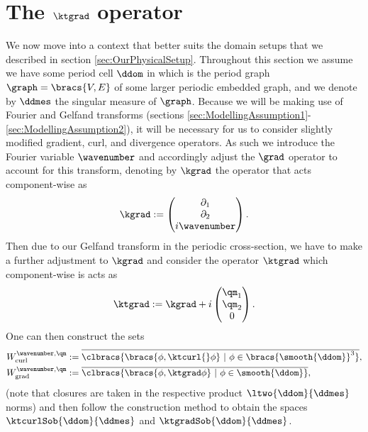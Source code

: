 \section{The $\ktgrad$ operator} \label{sec:ktOperator}
We now move into a context that better suits the domain setups that we described in section \ref{sec:OurPhysicalSetup}.
Throughout this section we assume we have some period cell $\ddom$ in which is the period graph $\graph=\bracs{V,E}$ of some larger periodic embedded graph, and we denote by $\ddmes$ the singular measure of $\graph$.
Because we will be making use of Fourier and Gelfand transforms (sections \ref{sec:ModellingAssumption1}-\ref{sec:ModellingAssumption2}), it will be necessary for us to consider slightly modified gradient, curl, and divergence operators.
As such we introduce the Fourier variable $\wavenumber$ and accordingly adjust the $\grad$ operator to account for this transform, denoting by $\kgrad$ the operator that acts component-wise as
\begin{align*}
	\kgrad := \begin{pmatrix} \partial_1 \\ \partial_2 \\ i\wavenumber\end{pmatrix}.
\end{align*}
Then due to our Gelfand transform in the periodic cross-section, we have to make a further adjustment to $\kgrad$ and consider the operator $\ktgrad$ which component-wise is acts as
\begin{align*}
	\ktgrad := \kgrad + i\begin{pmatrix} \qm_1 \\ \qm_2 \\ 0 \end{pmatrix}.
\end{align*}
One can then construct the sets
\begin{subequations} \label{eq:WktDefinitions}
	\begin{align}
		W^{\wavenumber, \qm}_{\mathrm{curl}} &:= \overline{ \clbracs{ \bracs{\phi, \ktcurl{}\phi} \ \vert \ \phi\in\bracs{\smooth{\ddom}}^3 } }, \\
		W^{\wavenumber, \qm}_{\mathrm{grad}} &:= \overline{ \clbracs{ \bracs{\phi, \ktgrad\phi} \ \vert \ \phi\in\smooth{\ddom} } },
	\end{align}
\end{subequations}
(note that closures are taken in the respective product $\ltwo{\ddom}{\ddmes}$ norms) and then follow the construction method to obtain the spaces $\ktcurlSob{\ddom}{\ddmes}$ and $\ktgradSob{\ddom}{\ddmes}$.
